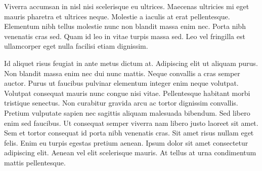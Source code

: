 \documentclass[12pt,twoside]{mitthesis}
\begin{document}
Viverra accumsan in nisl nisi scelerisque eu ultrices. Maecenas ultricies mi eget mauris pharetra et ultrices neque. Molestie a iaculis at erat pellentesque. Elementum nibh tellus molestie nunc non blandit massa enim nec. Porta nibh venenatis cras sed. Quam id leo in vitae turpis massa sed. Leo vel fringilla est ullamcorper eget nulla facilisi etiam dignissim.

Id aliquet risus feugiat in ante metus dictum at. Adipiscing elit ut aliquam purus. Non blandit massa enim nec dui nunc mattis. Neque convallis a cras semper auctor. Purus ut faucibus pulvinar elementum integer enim neque volutpat. Volutpat consequat mauris nunc congue nisi vitae. Pellentesque habitant morbi tristique senectus. Non curabitur gravida arcu ac tortor dignissim convallis. Pretium vulputate sapien nec sagittis aliquam malesuada bibendum. Sed libero enim sed faucibus. Ut consequat semper viverra nam libero justo laoreet sit amet. Sem et tortor consequat id porta nibh venenatis cras. Sit amet risus nullam eget felis. Enim eu turpis egestas pretium aenean. Ipsum dolor sit amet consectetur adipiscing elit. Aenean vel elit scelerisque mauris. At tellus at urna condimentum mattis pellentesque.

\begin{singlespace}


\end{singlespace}
\end{document}
